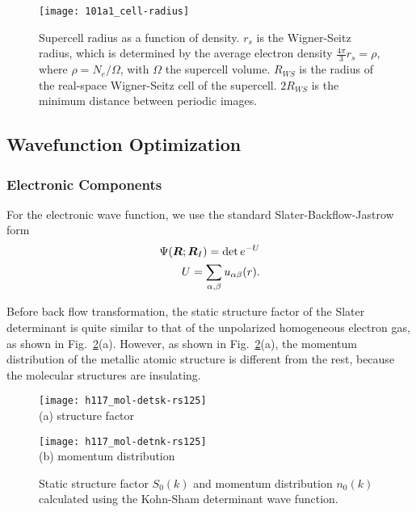 \begin{figure}[h]
\centering
\texttt{[image: 101a1\_cell-radius]}
\caption{Supercell radius as a function of density. $r_s$ is the Wigner-Seitz radius, which is determined by the average electron density $\frac{4\pi}{3}r_s=\rho$, where $\rho=N_e/\Omega$, with $\Omega$ the supercell volume. $R_{WS}$ is the radius of the real-space Wigner-Seitz cell of the supercell. $2R_{WS}$ is the minimum distance between periodic images. \label{fig:cell-radius}}
\end{figure}

%
%

\subsection{Wavefunction Optimization}

\subsubsection{Electronic Components}
For the electronic wave function, we use the standard Slater-Backflow-Jastrow form
\begin{align}
\Psi(\boldsymbol{R};\boldsymbol{R}_I) = \det e^{-U} \\
U = \sum_{\alpha,\beta} u_{\alpha\beta}(r).
\end{align}

Before back flow transformation, the static structure factor of the Slater determinant is quite similar to that of the unpolarized homogeneous electron gas, as shown in Fig.~\ref{fig:hsolid-det-sk-nk}(a). However, as shown in  Fig.~\ref{fig:hsolid-det-sk-nk}(a), the momentum distribution of the metallic atomic structure is different from the rest, because the molecular structures are insulating.

\begin{figure}[h]
\centering
\begin{minipage}{0.49\textwidth}
\centering
\texttt{[image: h117\_mol-detsk-rs125]}\\
(a) structure factor
\end{minipage}
\begin{minipage}{0.49\textwidth}
\centering
\texttt{[image: h117\_mol-detnk-rs125]}\\
(b) momentum distribution
\end{minipage}
\caption{Static structure factor $S_0(k)$ and momentum distribution $n_0(k)$ calculated using the Kohn-Sham determinant wave function.}
\label{fig:hsolid-det-sk-nk}
\end{figure}

